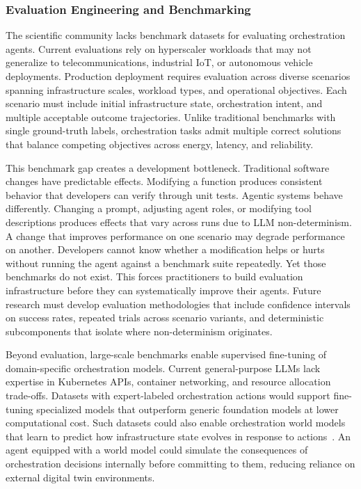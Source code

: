 \subsubsection{Evaluation Engineering and Benchmarking}
\label{subsubsec:ch6_evaluation_engineering}

The scientific community lacks benchmark datasets for evaluating orchestration agents. Current evaluations rely on hyperscaler workloads that may not generalize to telecommunications, industrial \ac{IoT}, or autonomous vehicle deployments. Production deployment requires evaluation across diverse scenarios spanning infrastructure scales, workload types, and operational objectives. Each scenario must include initial infrastructure state, orchestration intent, and multiple acceptable outcome trajectories. Unlike traditional benchmarks with single ground-truth labels, orchestration tasks admit multiple correct solutions that balance competing objectives across energy, latency, and reliability.

This benchmark gap creates a development bottleneck. Traditional software changes have predictable effects. Modifying a function produces consistent behavior that developers can verify through unit tests. Agentic systems behave differently. Changing a prompt, adjusting agent roles, or modifying tool descriptions produces effects that vary across runs due to \ac{LLM} non-determinism. A change that improves performance on one scenario may degrade performance on another. Developers cannot know whether a modification helps or hurts without running the agent against a benchmark suite repeatedly. Yet those benchmarks do not exist. This forces practitioners to build evaluation infrastructure before they can systematically improve their agents. Future research must develop evaluation methodologies that include confidence intervals on success rates, repeated trials across scenario variants, and deterministic subcomponents that isolate where non-determinism originates.

Beyond evaluation, large-scale benchmarks enable supervised fine-tuning of domain-specific orchestration models. Current general-purpose \acp{LLM} lack expertise in Kubernetes \acp{API}, container networking, and resource allocation trade-offs. Datasets with expert-labeled orchestration actions would support fine-tuning specialized models that outperform generic foundation models at lower computational cost. Such datasets could also enable orchestration world models that learn to predict how infrastructure state evolves in response to actions~\cite{huang2026vjepa}. An agent equipped with a world model could simulate the consequences of orchestration decisions internally before committing to them, reducing reliance on external digital twin environments.

